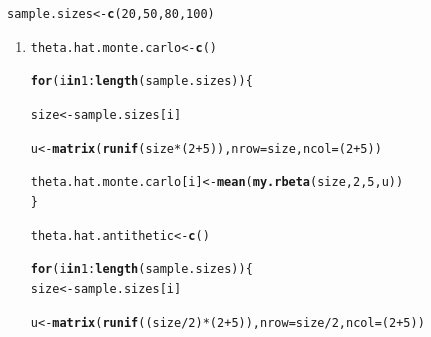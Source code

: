 \documentclass[11pt, a4paper]{article}\usepackage[]{graphicx}\usepackage[]{xcolor}
\makeatletter
\newcommand{\hlnum}[1]{\textcolor[rgb]{0.686,0.059,0.569}{#1}}%
\newcommand{\hlopt}[1]{\textcolor[rgb]{0,0,0}{#1}}%
\newcommand{\hldef}[1]{\textcolor[rgb]{0.345,0.345,0.345}{#1}}%
\newcommand{\hlkwa}[1]{\textcolor[rgb]{0.161,0.373,0.58}{\textbf{#1}}}%
\newcommand{\hlkwb}[1]{\textcolor[rgb]{0.69,0.353,0.396}{#1}}%
\newcommand{\hlkwc}[1]{\textcolor[rgb]{0.333,0.667,0.333}{#1}}%
\newcommand{\hlkwd}[1]{\textcolor[rgb]{0.737,0.353,0.396}{\textbf{#1}}}%
\newenvironment{kframe}{%
 \def\at@end@of@kframe{}%
 \ifinner\ifhmode%
  \def\at@end@of@kframe{\end{minipage}}%
  \begin{minipage}{\columnwidth}%
 \fi\fi%
 \def\FrameCommand##1{\hskip\@totalleftmargin \hskip-\fboxsep
 \colorbox{shadecolor}{##1}\hskip-\fboxsep
     \hskip-\linewidth \hskip-\@totalleftmargin \hskip\columnwidth}%
 \MakeFramed {\advance\hsize-\width
   \@totalleftmargin\z@ \linewidth\hsize
   \@setminipage}}%
 {\par\unskip\endMakeFramed%
 \at@end@of@kframe}
\newenvironment{knitrout}{}{} %
\makeatother
\begin{document}
\begin{knitrout}
\color{fgcolor}\begin{kframe}
\begin{alltt}
\hldef{sample.sizes} \hlkwb{<-} \hlkwd{c}\hldef{(}\hlnum{20}\hldef{,} \hlnum{50}\hldef{,} \hlnum{80}\hldef{,} \hlnum{100}\hldef{)}
\end{alltt}
\end{kframe}
\end{knitrout}

\begin{enumerate}

\item[\scalebox{2.0}{\twemoji{keycap: 1}}]

\begin{knitrout}
\color{fgcolor}\begin{kframe}
\begin{alltt}
\hldef{theta.hat.monte.carlo} \hlkwb{<-} \hlkwd{c}\hldef{()}

\hlkwa{for} \hldef{(i} \hlkwa{in} \hlnum{1}\hlopt{:}\hlkwd{length}\hldef{(sample.sizes)) \{}

  \hldef{size} \hlkwb{<-} \hldef{sample.sizes[i]}

  \hldef{u} \hlkwb{<-} \hlkwd{matrix}\hldef{(}\hlkwd{runif}\hldef{(size} \hlopt{*} \hldef{(}\hlnum{2} \hlopt{+} \hlnum{5}\hldef{)),} \hlkwc{nrow} \hldef{= size,} \hlkwc{ncol} \hldef{= (}\hlnum{2} \hlopt{+} \hlnum{5}\hldef{))}

  \hldef{theta.hat.monte.carlo[i]} \hlkwb{<-} \hlkwd{mean}\hldef{(}\hlkwd{my.rbeta}\hldef{(size,} \hlnum{2}\hldef{,} \hlnum{5}\hldef{, u))}
\hldef{\}}
\end{alltt}
\end{kframe}
\end{knitrout}



\begin{knitrout}
\color{fgcolor}\begin{kframe}
\begin{alltt}
\hldef{theta.hat.antithetic} \hlkwb{<-} \hlkwd{c}\hldef{()}

\hlkwa{for} \hldef{(i} \hlkwa{in} \hlnum{1}\hlopt{:}\hlkwd{length}\hldef{(sample.sizes)) \{}
  \hldef{size} \hlkwb{<-} \hldef{sample.sizes[i]}

  \hldef{u} \hlkwb{<-} \hlkwd{matrix}\hldef{(}\hlkwd{runif}\hldef{((size} \hlopt{/} \hlnum{2}\hldef{)} \hlopt{*} \hldef{(}\hlnum{2} \hlopt{+} \hlnum{5}\hldef{)),} \hlkwc{nrow} \hldef{= size} \hlopt{/} \hlnum{2}\hldef{,} \hlkwc{ncol} \hldef{= (}\hlnum{2} \hlopt{+} \hlnum{5}\hldef{))}


\end{alltt}
\end{kframe}
\end{knitrout}
\end{enumerate}
\end{document}
